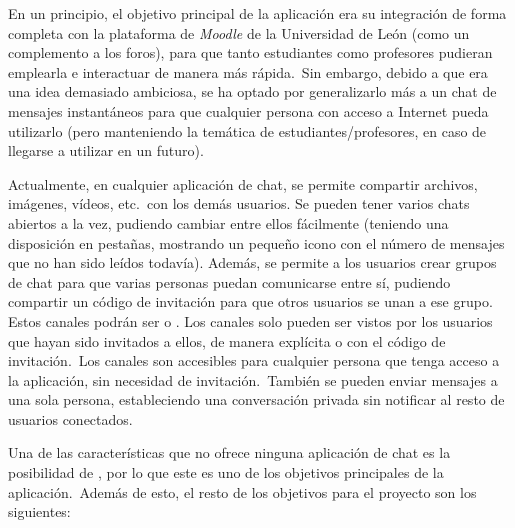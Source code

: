 En un principio, el objetivo principal de la aplicación era su integración de forma completa con la plataforma de
\textit{Moodle} de la Universidad de León (como un complemento a los foros), para que tanto estudiantes como profesores
pudieran emplearla e interactuar de manera más rápida.\ Sin embargo, debido a que era una idea demasiado ambiciosa,
se ha optado por generalizarlo más a un chat de mensajes instantáneos para que cualquier persona con acceso a
Internet pueda utilizarlo (pero manteniendo la temática de estudiantes/profesores, en caso de llegarse a utilizar en
un futuro).

Actualmente, en cualquier aplicación de chat, se permite compartir archivos, imágenes, vídeos, etc.\ con los demás
usuarios.
Se pueden tener varios chats abiertos a la vez, pudiendo cambiar entre ellos fácilmente (teniendo una disposición en
pestañas, mostrando un pequeño icono con el número de mensajes que no han sido leídos todavía).
Además, se permite a los usuarios crear grupos de chat para que varias personas puedan
comunicarse entre sí, pudiendo compartir un código de invitación para que otros usuarios se unan a ese grupo.
Estos canales podrán ser  o .
Los canales  solo pueden ser vistos por los usuarios que hayan sido invitados a ellos, de manera
explícita o con el código de invitación.\ Los canales  son accesibles para cualquier persona que
tenga acceso a la aplicación, sin necesidad de invitación.\ También se pueden enviar mensajes a una sola persona,
estableciendo una conversación privada sin notificar al resto de usuarios conectados.

Una de las características que no ofrece ninguna aplicación de chat es la posibilidad de
, por lo que este es uno de los objetivos principales de la
aplicación.\ Además de esto, el resto de los objetivos para el proyecto son los siguientes:

